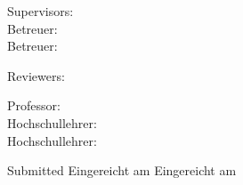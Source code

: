 \begin{titlepage}
\begin{center}
	\vspace{.5cm}
\end{center}

	\noindent
	\ifx\doclanguage\english
		Supervisors: \\
	\fi
	\ifx\doclanguage\german
		Betreuer: \\
	\fi
	\ifx\doclanguage\ngerman
		Betreuer: \\
	\fi
	\supervisors
	
	\vspace{.5cm}
	
	\noindent
	\ifx\doclanguage\english
		Reviewers: \\
	\fi
	\reviewers
	
	\vspace{.5cm}
	
	\noindent
	\ifx\doclanguage\english
		Professor: \\
	\fi
	\ifx\doclanguage\german
		Hochschullehrer: \\
	\fi
	\ifx\doclanguage\ngerman
		Hochschullehrer: \\
	\fi
	\professor
	
	\vspace{1.5cm}
	
	\noindent
	\ifx\doclanguage\english
		Submitted
	\fi
	\ifx\doclanguage\german
		Eingereicht am
	\fi
	\ifx\doclanguage\ngerman
		Eingereicht am
	\fi
	\docdate



\end{titlepage}

\restoregeometry


